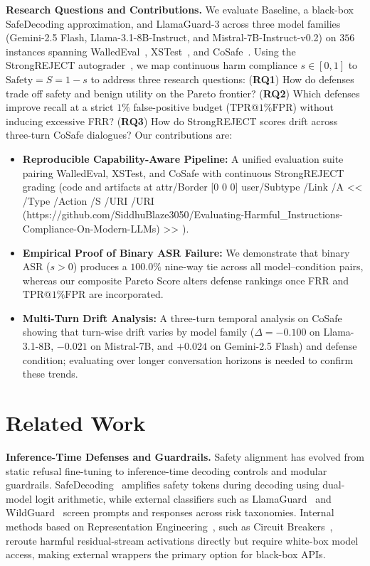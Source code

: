 \documentclass[letterpaper]{article}
\newcommand{\aaaiurl}{%
  {\sloppy\pdfstartlink attr{/Border [0 0 0]} user{/Subtype /Link /A << /Type /Action /S /URI /URI (https://github.com/SiddhuBlaze3050/Evaluating-Harmful_Instructions-Compliance-On-Modern-LLMs) >>}%
  \githuburl%
  \pdfendlink}%
}
\begin{document}
\textbf{Research Questions and Contributions.} We evaluate Baseline, a black-box SafeDecoding approximation, and LlamaGuard-3 across three model families (Gemini-2.5 Flash, Llama-3.1-8B-Instruct, and Mistral-7B-Instruct-v0.2) on $356$ instances spanning WalledEval~\citep{walledeval2024}, XSTest~\citep{rottger2023xstest}, and CoSafe~\citep{yu2024cosafe}. Using the StrongREJECT autograder~\citep{souly2024strongreject}, we map continuous harm compliance $s \in [0,1]$ to $\text{Safety} = S = 1 - s$ to address three research questions: (\textbf{RQ1}) How do defenses trade off safety and benign utility on the Pareto frontier? (\textbf{RQ2}) Which defenses improve recall at a strict $1\%$ false-positive budget ($\text{TPR@1\%FPR}$) without inducing excessive FRR? (\textbf{RQ3}) How do StrongREJECT scores drift across three-turn CoSafe dialogues? Our contributions are:
\begin{itemize}
    \item \textbf{Reproducible Capability-Aware Pipeline:} A unified evaluation suite pairing WalledEval, XSTest, and CoSafe with continuous StrongREJECT grading (code and artifacts at \aaaiurl).
    \item \textbf{Empirical Proof of Binary ASR Failure:} We demonstrate that binary ASR ($s > 0$) produces a $100.0\%$ nine-way tie across all model--condition pairs, whereas our composite Pareto Score alters defense rankings once FRR and $\text{TPR@1\%FPR}$ are incorporated.
    \item \textbf{Multi-Turn Drift Analysis:} A three-turn temporal analysis on CoSafe showing that turn-wise drift varies by model family ($\Delta = -0.100$ on Llama-3.1-8B, $-0.021$ on Mistral-7B, and $+0.024$ on Gemini-2.5 Flash) and defense condition; evaluating over longer conversation horizons is needed to confirm these trends.
\end{itemize}

\section{Related Work}
\label{sec:related_work}

\textbf{Inference-Time Defenses and Guardrails.} Safety alignment has evolved from static refusal fine-tuning to inference-time decoding controls and modular guardrails. SafeDecoding~\citep{xu2024safedecoding} amplifies safety tokens during decoding using dual-model logit arithmetic, while external classifiers such as LlamaGuard~\citep{inan2023llamaguard, fedorov2024llama} and WildGuard~\citep{han2024wildguard} screen prompts and responses across risk taxonomies. Internal methods based on Representation Engineering~\citep{zou2023representation}, such as Circuit Breakers~\citep{zou2024improving}, reroute harmful residual-stream activations directly but require white-box model access, making external wrappers the primary option for black-box APIs.
\end{document}
